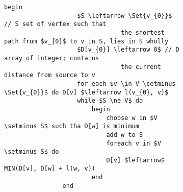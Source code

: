\documentclass{subfiles}
\begin{document}
\begin{figure}[!h]
    \centering
    \begin{subfigure}[b]{0.85\textwidth}
        \begin{lstlisting}[language = algol]
                begin
                    $S \leftarrow \Set{v_{0}}$ // S set of vertex such that
                                the shortest path from $v_{0}$ to v in S, lies in S wholly
                    $D[v_{0}] \leftarrow 0$ // D array of integer; contains
                                the current distance from source to v
                    for each $v \in V \setminus \Set{v_{0}}$ do D[v] $\leftarrow l(v_{0}, v)$ 
                    while $S \ne V$ do 
                        begin 
                            choose w in $V \setminus S$ such tha D[w] is minimum
                            add w to S
                            foreach v in $V \setminus S$ do 
                            D[v] $leftarrow$ MIN(D[v], D[w] + l(w, v))
                        end
                end        
            \end{lstlisting}
    \end{subfigure}
    \label{Fig:}
\end{figure}
\end{document}

